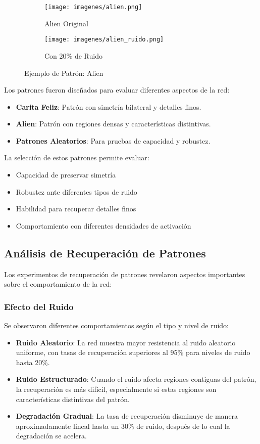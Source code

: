 \documentclass{article}
\begin{document}
\begin{figure}[h]
    \centering
    \begin{subfigure}[b]{0.3\textwidth}
        \texttt{[image: imagenes/alien.png]}
        \caption{Alien Original}
    \end{subfigure}
    \begin{subfigure}[b]{0.3\textwidth}
        \texttt{[image: imagenes/alien\_ruido.png]}
        \caption{Con 20\% de Ruido}
    \end{subfigure}
    \caption{Ejemplo de Patrón: Alien}
    \label{fig:alien}
\end{figure}

Los patrones fueron diseñados para evaluar diferentes aspectos de la red:
\begin{itemize}
    \item \textbf{Carita Feliz}: Patrón con simetría bilateral y detalles finos.
    \item \textbf{Alien}: Patrón con regiones densas y características distintivas.
    \item \textbf{Patrones Aleatorios}: Para pruebas de capacidad y robustez.
\end{itemize}

La selección de estos patrones permite evaluar:
\begin{itemize}
    \item Capacidad de preservar simetría
    \item Robustez ante diferentes tipos de ruido
    \item Habilidad para recuperar detalles finos
    \item Comportamiento con diferentes densidades de activación
\end{itemize}

\subsection{Análisis de Recuperación de Patrones}
Los experimentos de recuperación de patrones revelaron aspectos importantes sobre el comportamiento de la red:

\subsubsection{Efecto del Ruido}
Se observaron diferentes comportamientos según el tipo y nivel de ruido:

\begin{itemize}
    \item \textbf{Ruido Aleatorio}: La red muestra mayor resistencia al ruido aleatorio uniforme, con tasas de recuperación superiores al 95\% para niveles de ruido hasta 20\%.
    \item \textbf{Ruido Estructurado}: Cuando el ruido afecta regiones contiguas del patrón, la recuperación es más difícil, especialmente si estas regiones son características distintivas del patrón.
    \item \textbf{Degradación Gradual}: La tasa de recuperación disminuye de manera aproximadamente lineal hasta un 30\% de ruido, después de lo cual la degradación se acelera.
\end{itemize}
\end{document}
